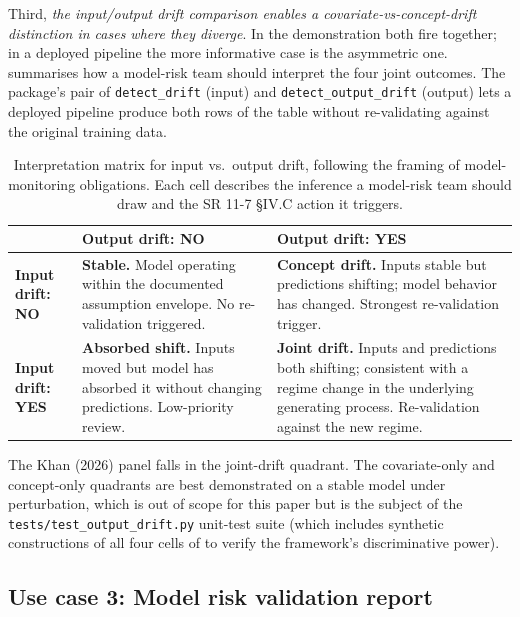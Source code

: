 Third, \emph{the input/output drift comparison enables a covariate-vs-concept-drift distinction in cases where they diverge}. In the demonstration both fire together; in a deployed pipeline the more informative case is the asymmetric one.  summarises how a model-risk team should interpret the four joint outcomes. The package's pair of \texttt{detect\_drift} (input) and \texttt{detect\_output\_drift} (output) lets a deployed pipeline produce both rows of the table without re-validating against the original training data.

\begin{table}[H]
\centering
\caption{Interpretation matrix for input vs.\ output drift, following the \citet{Raji2020Audit} framing of model-monitoring obligations. Each cell describes the inference a model-risk team should draw and the SR 11-7 §IV.C action it triggers.}\label{tab:drift_interpretation}
\footnotesize
\begin{tabular}{p{2.4cm}p{5.6cm}p{5.6cm}}
\toprule
              & \textbf{Output drift: NO}                                                          & \textbf{Output drift: YES} \\
\midrule
\textbf{Input drift: NO}  & \textbf{Stable.} Model operating within the documented assumption envelope. No re-validation triggered. & \textbf{Concept drift.} Inputs stable but predictions shifting; model behavior has changed. Strongest re-validation trigger. \\
\midrule
\textbf{Input drift: YES} & \textbf{Absorbed shift.} Inputs moved but model has absorbed it without changing predictions. Low-priority review. & \textbf{Joint drift.} Inputs and predictions both shifting; consistent with a regime change in the underlying generating process. Re-validation against the new regime. \\
\bottomrule
\end{tabular}
\end{table}

The Khan (2026) panel falls in the joint-drift quadrant. The covariate-only and concept-only quadrants are best demonstrated on a stable model under perturbation, which is out of scope for this paper but is the subject of the \texttt{tests/test\_output\_drift.py} unit-test suite (which includes synthetic constructions of all four cells of  to verify the framework's discriminative power).

\subsection{Use case 3: Model risk validation report}\label{sec:demonstration_validation}

